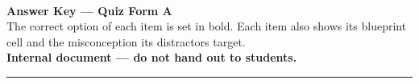 \documentclass[11pt]{exam}
\begin{document}
\begin{center}
  {\Large\bfseries \labtitle}\\[0.4em]
  {\LARGE\bfseries Answer Key --- Quiz Form A}\\[0.6em]
  {\small The correct option of each item is set in bold. Each item also shows its blueprint
  cell and the misconception its distractors target.}\\[0.4em]
  {\small\bfseries Internal document --- do not hand out to students.}
\end{center}

\vspace{0.8em}
\noindent\rule{\linewidth}{1pt}


\end{document}
